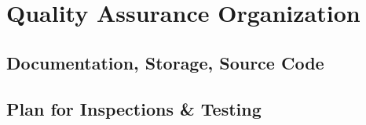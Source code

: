 \section{Quality Assurance Organization}

\subsection{Documentation, Storage, Source Code} \label{sec:documentation_storage_source_code}

\begin{comment}
    Documentation
        Andre skal kanskje bruke eller gjenbruke produktet vårt, så viktig med dokumentasjon av både sluttproduktet, i tillegg til hele prosessen.

        Kode-produkter(?)
            Deployment
            APIdoc

        Arbeidsprosessen
            Så mye som mulig skal ligge under issues under GitHub Project, slik at vi dokumenterer hva vi har gjort. Timeføring blir gjort i Traggo som er tag-basert, slik at vi kan se hvor lenge vi har jobbet med feks admin, thesis, metting osv.
        
        Møter og enigheter
            Møtenotater/referat skal bli tatt av alle møter
            Alle viktige valg som blir gjort etter diskusjoner blir notert
        
    Storage ?
        Skylagring i de SaaS vi bruker (Overleaf, Teamgantt, Traggo(?), fler) med backup i git for latex dokumenter og annet fil-basert data, google drive for dokumenter. I tilegg til lokal lagring på hvert medlems pc

    Source code
        Dokumentasjon av koden kommer til å bli brukt av gruppemedlemene, men kan også bli brukt av noen som vil videreutvikle produktet.
        Følge industri-standard dokumentasjon og kodestil for hvert kodespråk, med hyppig bruk av en linter. 
        Prøve å skrive self-documenting code ved å ha descriptive funksjonsnavn og variabler, slik at man kan holde kodekommentarene korte og konsise
        
\end{comment}

\subsection{Plan for Inspections \& Testing}\label{sec:plan_for_inspections_&_testing}

\begin{comment}
    - GitOps som et sentralt konsept
    - Bruke CICD Pipelines for å automatisere så mye som mulig
    f.eks. statiske kodesjekker og inspections, unittester og integrasjonstester, også deployment for å kunne ha manuelle inspeksjoner og tester during development.
    - Linting for Go (eks. golangci-lint).
    - Plan om usertesting etter vi har MVP på plass midt i mars, jobbe utifra kravspesifikasjon og tilbakemelding fra productowner fram til det.
    
\end{comment}

